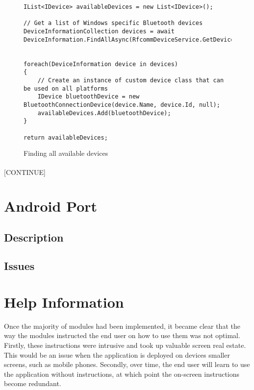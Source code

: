 		\begin{figure}[h]
			\begin{lstlisting}
IList<IDevice> availableDevices = new List<IDevice>();

// Get a list of Windows specific Bluetooth devices
DeviceInformationCollection devices = await DeviceInformation.FindAllAsync(RfcommDeviceService.GetDeviceSelector(RfcommServiceId.SerialPort));


foreach(DeviceInformation device in devices)
{
	// Create an instance of custom device class that can be used on all platforms
	IDevice bluetoothDevice = new BluetoothConnectionDevice(device.Name, device.Id, null);
    availableDevices.Add(bluetoothDevice);
}

return availableDevices;
			\end{lstlisting}
			\caption{Finding all available devices}
			\label{code:AvailableDevices}
		\end{figure}
		
		\paragraph{}{
		[CONTINUE]		
		}				
		
\section{Android Port}
	\subsection{Description}		
		\paragraph{}{
		}	
	\subsection{Issues}{
	}
	\label{ssec:AndroidIssues}
\section{Help Information}
		\paragraph{}{
		Once the majority of modules had been implemented, it became clear that the way the modules instructed the end user on how to use them was not optimal. Firstly, these instructions were intrusive and took up valuable screen real estate. This would be an issue when the application is deployed on devices smaller screens, such as mobile phones. Secondly, over time, the end user will learn to use the application without instructions, at which point the on-screen instructions become redundant.
		}
